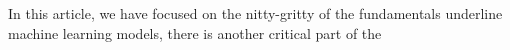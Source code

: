 In this article, we have focused on the nitty-gritty of the fundamentals underline machine learning models, there is another critical part of the 